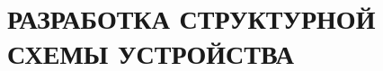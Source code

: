\begin{sloppypar} %
\newpage %
\section{РАЗРАБОТКА СТРУКТУРНОЙ СХЕМЫ УСТРОЙСТВА} %







\end{sloppypar}
